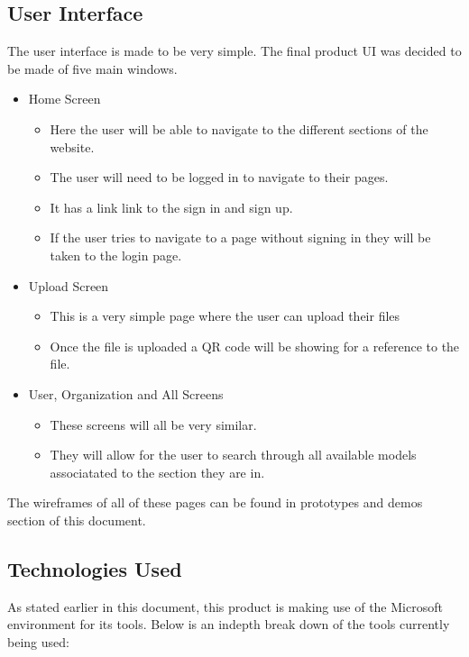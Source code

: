 \subsection{User Interface}
The user interface is made to be very simple. The final product
UI was decided to be made of five main windows. 
\begin{itemize}
    \item Home Screen
    \begin{itemize}
        \item Here the user will be able to navigate to the different sections of the website.
        \item The user will need to be logged in to navigate to their pages.
        \item It has a link link to the sign in and sign up.
        \item If the user tries to navigate to a page without signing in
        they will be taken to the login page.
    \end{itemize}

    \item Upload Screen
    \begin{itemize}
        \item This is a very simple page where the user can upload their files
        \item Once the file is uploaded a QR code will be showing for a reference to the file.
    \end{itemize}

    \item User, Organization and All Screens
    \begin{itemize}
        \item These screens will all be very similar.
        \item They will allow for the user to search through all
        available models associatated to the section they are in.
    \end{itemize}
\end{itemize}

The wireframes of all of these pages can be found in prototypes and demos section of this document.


\subsection{Technologies Used}

    As stated earlier in this document, this product is making use
    of the Microsoft environment for its tools. Below is an indepth 
    break down of the tools currently being used:

